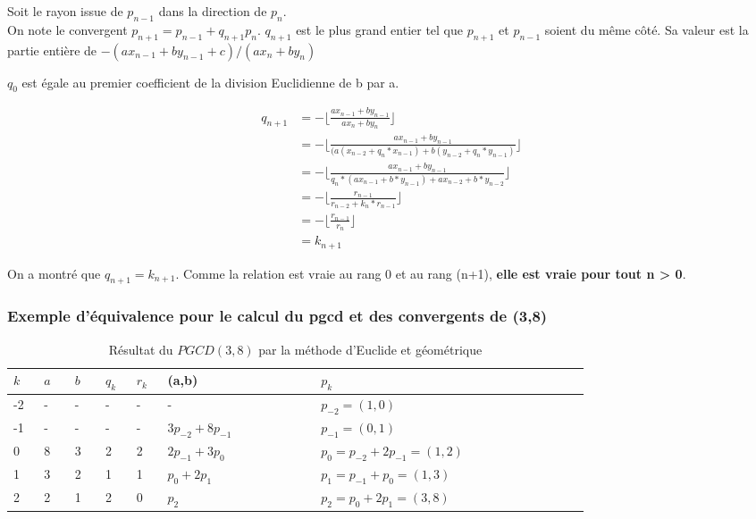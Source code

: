 Soit le rayon issue de $p_{n-1}$ dans la direction de $p_{n}$.\\
On note le convergent $p_{n+1} = p_{n-1} + q_{n+1} p_{n}$. $q_{n+1}$ est le plus grand entier tel que $p_{n+1}$ et $p_{n-1}$ soient du même côté. Sa valeur est la partie entière de $-(a x_{n-1} + b y_{n-1} +c)/(a x_{n} + b y_{n})$


$q_0$ est égale au premier coefficient de la division Euclidienne de b par a.

\begin{align*}
q_{n+1} &= - \lfloor\frac{a x_{n-1} + b y_{n-1}}{ a x_{n} + b y_{n}}\rfloor \\
        &= - \lfloor\frac{a x_{n-1} + b y_{n-1}}{ (a (x_{n-2} + q_n * x_{n-1}) + b (y_{n-2} + q_n * y_{n-1})}\rfloor \\
        &= - \lfloor\frac{a x_{n-1} + b y_{n-1}}{ q_n*(a x_{n-1} + b*y_{n-1} ) + a x_{n-2} + b*y_{n-2}  }\rfloor \\
        &= - \lfloor\frac{r_{n-1}              }{ r_{n-2} + k_n * r_{n-1}}\rfloor \\
        &= - \lfloor\frac{r_{n-1}              }{ r_{n} }\rfloor \\
        &= k_{n+1}
\end{align*}

On a montré que \textbf{$q_{n+1}= k_{n+1}$}. Comme la relation est vraie au rang 0 et au rang (n+1),  \textbf{elle est vraie pour tout n > 0}.

\subsubsection{Exemple d'équivalence pour le calcul du pgcd et des convergents de (3,8)}

 \begin{table}[H]
   \centering
   \begin{tabular}{|p{0.04\linewidth}|p{0.04\linewidth}|p{0.04\linewidth}||p{0.04\linewidth}|p{0.04\linewidth}||p{0.2\linewidth}||p{0.35\linewidth}|}
     \hline 
     $k$ & $a$ & $b$ & $q_{k}$ & $r_k$ & (a,b) & $p_k$ \\
     \hline 
     -2 & - & - & - & - & -                    & $p_{-2} = (1,0)$\\
     -1 & - & - & - & - & $3 p_{-2} + 8p_{-1}$ & $p_{-1} = (0,1)$\\
      0 & 8 & 3 & 2 & 2 & $2 p_{-1} + 3p_{0}$  & $p_{0}  = p_{-2} + 2p_{-1} = (1,2)$\\ 
      1 & 3 & 2 & 1 & 1 & $p_{0}  + 2p_{1}$    & $p_{1}  = p_{-1} + p_{0} = (1,3)$\\
      2 & 2 & 1 & 2 & 0 & $p_{2}$              & $p_{2}  = p_{0} + 2p_{1} = (3,8)$\\
     \hline
   \end{tabular} 
   \caption{Résultat du $PGCD(3,8)$ par la méthode d'Euclide et géométrique}
 \end{table}

